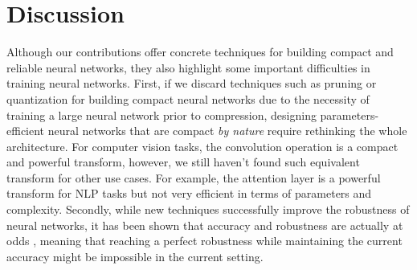 \section{Discussion}
\label{section:ch6-discussion}

Although our contributions offer concrete techniques for building compact and reliable neural networks, they also highlight some important difficulties in training neural networks. 
First, if we discard techniques such as pruning or quantization for building compact neural networks due to the necessity of training a large neural network prior to compression, designing parameters-efficient neural networks that are compact \emph{by nature} require rethinking the whole architecture.
For computer vision tasks, the convolution operation is a compact and powerful transform, however, we still haven't found such equivalent transform for other use cases.
For example, the attention layer is a powerful transform for NLP tasks but not very efficient in terms of parameters and complexity.
Secondly, while new techniques successfully improve the robustness of neural networks, it has been shown that accuracy and robustness are actually at odds \cite{zhang2019theoretically}, meaning that reaching a perfect robustness while maintaining the current accuracy might be impossible in the current setting.



